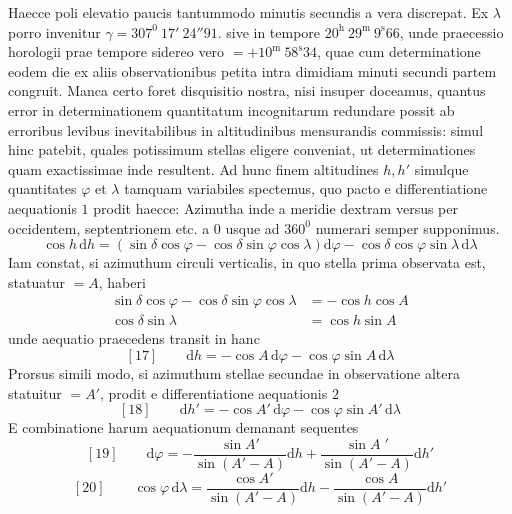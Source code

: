 Haecce poli elevatio paucis tantummodo minutis secundis a vera discrepat. Ex $\lambda$ porro invenitur $\gamma=307^0\ 17'\ 24''91$. sive in tempore $20^{\mathrm h}\ 29^{\mathrm m}\ 9^{\mathrm s}66$, unde praecessio horologii prae tempore sidereo vero $=+10^{\mathrm m}\ 58^{\mathrm s}34$, quae cum determinatione eodem die ex aliis observationibus petita intra dimidiam minuti secundi partem congruit.
Manca certo foret disquisitio nostra, nisi insuper doceamus, quantus error in determinationem quantitatum incognitarum redundare possit ab erroribus levibus inevitabilibus in altitudinibus mensurandis commissis: simul hinc patebit, quales potissimum stellas eligere conveniat, ut determinationes quam exactissimae inde resultent. Ad hunc finem altitudines $h,h'$ simulque quantitates $\varphi$ et $\lambda$ tamquam variabiles spectemus, quo pacto e differentiatione aequationis $1$ prodit haecce:
\expandafter\def\csname HistoricalNoteText1\endcsname{Azimutha inde a meridie dextram versus per occidentem, septentrionem etc. a $0$ usque ad $360^0$ numerari semper supponimus.}
\[
\cos h\,\mathrm dh=(\sin\delta\cos\varphi-\cos\delta\sin\varphi\cos\lambda)\mathrm d\varphi-\cos\delta\cos\varphi\sin\lambda\,\mathrm d\lambda
\]
Iam constat, si azimuthum circuli verticalis, in quo stella prima observata est, statuatur $=A$, haberi
\[
\begin{aligned}
\sin\delta\cos\varphi-\cos\delta\sin\varphi\cos\lambda&=-\cos h\cos A\\
\cos\delta\sin\lambda&=\cos h\sin A
\end{aligned}
\]
unde aequatio praecedens transit in hanc
\[
{}[17]\qquad\mathrm dh=-\cos A\,\mathrm d\varphi-\cos\varphi\sin A\,\mathrm d\lambda
\]
Prorsus simili modo, si azimuthum stellae secundae in observatione altera statuitur $=A'$, prodit e differentiatione aequationis $2$
\[
{}[18]\qquad\mathrm dh'=-\cos A'\,\mathrm d\varphi-\cos\varphi\sin A'\,\mathrm d\lambda
\]
E combinatione harum aequationum demanant sequentes
\[
{}[19]\qquad\mathrm d\varphi=-\frac{\sin A'}{\sin(A'-A)}\mathrm dh+\frac{\sin A\;{}'}{\sin(A'-A)}\mathrm dh'
\]
\[
{}[20]\qquad\cos\varphi\,\mathrm d\lambda=\frac{\cos A'}{\sin(A'-A)}\mathrm dh-\frac{\cos A}{\sin(A'-A)}\mathrm dh'
\]

